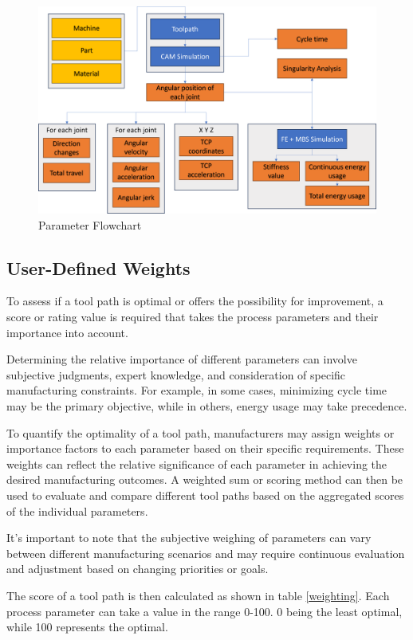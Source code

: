 \begin{figure}[H]
	\centerline{\includegraphics[scale=.55]{figures/Flow.png}}
	\caption{Parameter Flowchart}
	\label{ParamsFlow}
\end{figure}


\subsection{User-Defined Weights}\label{weights}
To assess if a tool path is optimal or offers the possibility for improvement, a score or rating value is required that takes the process parameters and their importance into account. 

Determining the relative importance of different parameters can involve subjective judgments, expert knowledge, and consideration of specific manufacturing constraints. For example, in some cases, minimizing cycle time may be the primary objective, while in others, energy usage may take precedence.

To quantify the optimality of a tool path, manufacturers may assign weights or importance factors to each parameter based on their specific requirements. These weights can reflect the relative significance of each parameter in achieving the desired manufacturing outcomes. A weighted sum or scoring method can then be used to evaluate and compare different tool paths based on the aggregated scores of the individual parameters.

It's important to note that the subjective weighing of parameters can vary between different manufacturing scenarios and may require continuous evaluation and adjustment based on changing priorities or goals.

The score of a tool path is then calculated as shown in table \ref{weighting}. Each process parameter can take a value in the range 0-100. 0 being the least optimal, while 100 represents the optimal.

